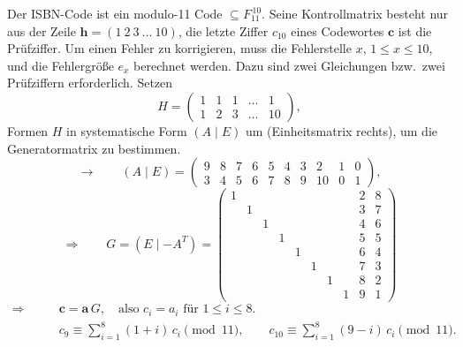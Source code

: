 Der ISBN-Code ist ein modulo-11 Code $\subseteq F_{11}^{\,10}$. Seine Kontrollmatrix besteht nur aus der Zeile
$\mathbf{h} = (1\ 2\ 3\ \dots\ 10)$, die letzte Ziffer $c_{10}$ eines Codewortes $\mathbf{c}$ ist die Prüfziffer.
Um einen Fehler zu korrigieren, muss die Fehlerstelle $x$, $1 \le x \le 10$, und die Fehlergröße $e_x$ berechnet werden.
Dazu sind zwei Gleichungen bzw.\ zwei Prüfziffern erforderlich. Setzen
\[
  H = \begin{pmatrix} 1 & 1 & 1 & \dots & 1\\ 1 & 2 & 3 & \dots & 10 \end{pmatrix},
\]
Formen $H$ in systematische Form $(A \mid E)$ um (Einheitsmatrix rechts), um die Generatormatrix zu bestimmen.
\[
  \to\qquad (A \mid E) = \begin{pmatrix}
    9 & 8 & 7 & 6 & 5 & 4 & 3 & 2 & 1 & 0\\
    3 & 4 & 5 & 6 & 7 & 8 & 9 & 10 & 0 & 1
  \end{pmatrix},
\]
\[
  \Rightarrow\qquad G = (E \mid -A^T) = \begin{pmatrix}
    1 & & & & & & & & 2 & 8\\
    & 1 & & & & & & & 3 & 7\\
    & & 1 & & & & & & 4 & 6\\
    & & & 1 & & & & & 5 & 5\\
    & & & & 1 & & & & 6 & 4\\
    & & & & & 1 & & & 7 & 3\\
    & & & & & & 1 & & 8 & 2\\
    & & & & & & & 1 & 9 & 1
  \end{pmatrix}
\]
\begin{align*}
  \Rightarrow\qquad & \mathbf{c} = \mathbf{a}\,G, \quad \text{also } c_i = a_i \text{ für } 1 \le i \le 8.\\
  & c_9 \equiv \sum_{i=1}^{8} (1+i)\,c_i \pmod{11}, \qquad c_{10} \equiv \sum_{i=1}^{8} (9-i)\,c_i \pmod{11}.
\end{align*}

